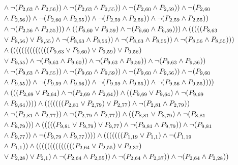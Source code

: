 \documentclass[10pt]{article}
\begin{document}
\begin{align*}
& \land \lnot(\PV{2,63} \land \PV{2,56})) \land \lnot(\PV{2,63} \land \PV{2,55})) \land \lnot(\PV{2,60} \land \PV{2,59})) \land \lnot(\PV{2,60} \\
& \land \PV{2,56})) \land \lnot(\PV{2,60} \land \PV{2,55})) \land \lnot(\PV{2,59} \land \PV{2,56})) \land \lnot(\PV{2,59} \land \PV{2,55})) \\
& \land \lnot(\PV{2,56} \land \PV{2,55}))) \land ((\PV{6,60} \lor \PV{6,59}) \land \lnot(\PV{6,60} \land \PV{6,59}))) \land (((((\PV{8,63} \\
& \lor \PV{8,56}) \lor \PV{8,55}) \land \lnot(\PV{8,63} \land \PV{8,56})) \land \lnot(\PV{8,63} \land \PV{8,55})) \land \lnot(\PV{8,56} \land \PV{8,55}))) \\
& \land ((((((((((((((\PV{9,63} \lor \PV{9,60}) \lor \PV{9,59}) \lor \PV{9,56}) \\
& \lor \PV{9,55}) \land \lnot(\PV{9,63} \land \PV{9,60})) \land \lnot(\PV{9,63} \land \PV{9,59})) \land \lnot(\PV{9,63} \land \PV{9,56})) \\
& \land \lnot(\PV{9,63} \land \PV{9,55})) \land \lnot(\PV{9,60} \land \PV{9,59})) \land \lnot(\PV{9,60} \land \PV{9,56})) \land \lnot(\PV{9,60} \\
& \land \PV{9,55})) \land \lnot(\PV{9,59} \land \PV{9,56})) \land \lnot(\PV{9,59} \land \PV{9,55})) \land \lnot(\PV{9,56} \land \PV{9,55})))) \\
& \land (((\PV{2,69} \lor \PV{2,64}) \land \lnot(\PV{2,69} \land \PV{2,64})) \land ((\PV{9,69} \lor \PV{9,64}) \land \lnot(\PV{9,69} \\
& \land \PV{9,64})))) \land (((((((\PV{2,81} \lor \PV{2,79}) \lor \PV{2,77}) \land \lnot(\PV{2,81} \land \PV{2,79})) \\
& \land \lnot(\PV{2,81} \land \PV{2,77})) \land \lnot(\PV{2,79} \land \PV{2,77})) \land ((\PV{8,81} \lor \PV{8,79}) \land \lnot(\PV{8,81} \\
& \land \PV{8,79}))) \land (((((\PV{9,81} \lor \PV{9,79}) \lor \PV{9,77}) \land \lnot(\PV{9,81} \land \PV{9,79})) \land \lnot(\PV{9,81} \\
& \land \PV{9,77})) \land \lnot(\PV{9,79} \land \PV{9,77})))) \land (((((((\PV{1,19} \lor \PV{1,1}) \land \lnot(\PV{1,19} \\
& \land \PV{1,1})) \land ((((((((((((((\PV{2,64} \lor \PV{2,55}) \lor \PV{2,37}) \\
& \lor \PV{2,28}) \lor \PV{2,1}) \land \lnot(\PV{2,64} \land \PV{2,55})) \land \lnot(\PV{2,64} \land \PV{2,37})) \land \lnot(\PV{2,64} \land \PV{2,28})) \\

\end{align*}
\end{document}
